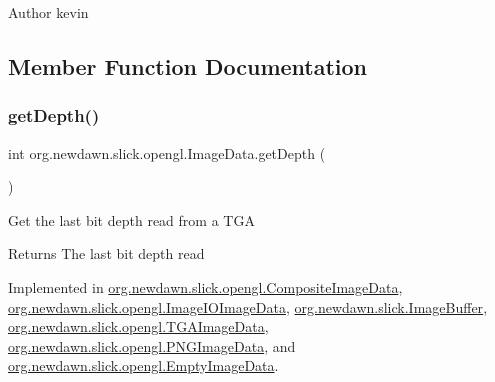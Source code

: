 \begin{DoxyAuthor}{Author}
kevin 
\end{DoxyAuthor}


\subsection{Member Function Documentation}
\mbox{\label{interfaceorg_1_1newdawn_1_1slick_1_1opengl_1_1_image_data_a69be40348e05222e8f0c65f5845adcb9}} 
\subsubsection{\texorpdfstring{get\+Depth()}{getDepth()}}
{\footnotesize\ttfamily int org.\+newdawn.\+slick.\+opengl.\+Image\+Data.\+get\+Depth (\begin{DoxyParamCaption}{ }\end{DoxyParamCaption})}

Get the last bit depth read from a T\+GA

\begin{DoxyReturn}{Returns}
The last bit depth read 
\end{DoxyReturn}


Implemented in \mbox{\hyperlink{classorg_1_1newdawn_1_1slick_1_1opengl_1_1_composite_image_data_a4f8b573391ec1fea885ef56daac0a8f4}{org.\+newdawn.\+slick.\+opengl.\+Composite\+Image\+Data}}, \mbox{\hyperlink{classorg_1_1newdawn_1_1slick_1_1opengl_1_1_image_i_o_image_data_afd522d9f35ccf5827cdeb75eade55d6f}{org.\+newdawn.\+slick.\+opengl.\+Image\+I\+O\+Image\+Data}}, \mbox{\hyperlink{classorg_1_1newdawn_1_1slick_1_1_image_buffer_af74cb0da09fe9e93dc1ff79547c2b608}{org.\+newdawn.\+slick.\+Image\+Buffer}}, \mbox{\hyperlink{classorg_1_1newdawn_1_1slick_1_1opengl_1_1_t_g_a_image_data_abcda568d9272d044fe65b2bba9905731}{org.\+newdawn.\+slick.\+opengl.\+T\+G\+A\+Image\+Data}}, \mbox{\hyperlink{classorg_1_1newdawn_1_1slick_1_1opengl_1_1_p_n_g_image_data_ae49f5e4da41bec192c7155e01805343c}{org.\+newdawn.\+slick.\+opengl.\+P\+N\+G\+Image\+Data}}, and \mbox{\hyperlink{classorg_1_1newdawn_1_1slick_1_1opengl_1_1_empty_image_data_a59090f7878211b179bcca316e3ea3e2f}{org.\+newdawn.\+slick.\+opengl.\+Empty\+Image\+Data}}.

